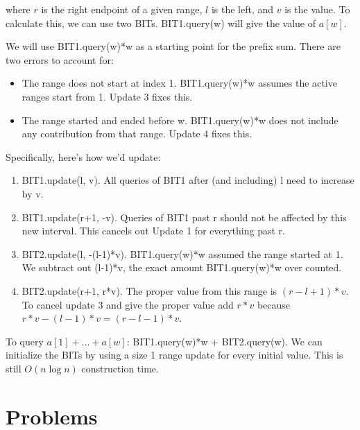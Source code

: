 \documentclass{article}
\begin{document}
            where $r$ is the right endpoint of a given range, $l$ is the left, and $v$ is the value.
            To calculate this, we can use two BITs. BIT1.query(w) will give the value of $a[w]$.
            
            We will use BIT1.query(w)*w as a starting point for the prefix sum.  There are two errors to account for:
            \begin{itemize}
                \item The range does not start at index 1. BIT1.query(w)*w assumes the active ranges start from 1. Update 3 fixes this.
                \item The range started and ended before w. BIT1.query(w)*w does not include any contribution from that range. Update 4 fixes this.
            \end{itemize}
            
            Specifically, here's how we'd update:
            \begin{enumerate}
                \item BIT1.update(l, v). All queries of BIT1 after (and including) l need to increase by v.
                \item BIT1.update(r+1, -v). Queries of BIT1 past r should not be affected by this new interval.  This cancels out Update 1 for everything past r.
                \item BIT2.update(l, -(l-1)*v). BIT1.query(w)*w assumed the range started at 1. We subtract out (l-1)*v, the exact amount BIT1.query(w)*w over counted.
                \item BIT2.update(r+1, r*v). The proper value from this range is $(r-l+1)*v$. To cancel update 3 and give the proper value add $r*v$ because $r*v-(l-1)*v=(r-l-1)*v$.
            \end{enumerate}
            
            To query $a[1]+...+a[w]$: BIT1.query(w)*w + BIT2.query(w).
            We can initialize the BITs by using a size 1 range update for every initial value.  This is still $O(n\log n)$ construction time.
            
\section{Problems}
\end{document}
